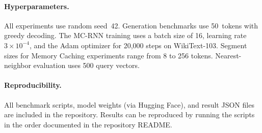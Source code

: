 \paragraph{Hyperparameters.}
All experiments use random seed~42.
Generation benchmarks use 50~tokens with greedy decoding.
The MC-RNN training uses a batch size of 16, learning rate $3 \times 10^{-4}$,
and the Adam optimizer for 20{,}000 steps on WikiText-103.
Segment sizes for Memory Caching experiments range from 8 to 256 tokens.
Nearest-neighbor evaluation uses 500 query vectors.

\paragraph{Reproducibility.}
All benchmark scripts, model weights (via Hugging Face), and result
JSON files are included in the repository.
Results can be reproduced by running the scripts in the order
documented in the repository README.
